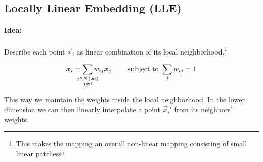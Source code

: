 

\newpage
\subsection{Locally Linear Embedding (LLE)}

\paragraph{Idea:} Describe each point \(\vec{x}_i\) as linear combination of its local neighborhood.\footnote{This makes the mapping an overall non-linear mapping consisting of small linear patches}

\[\vec{x}_i = \sum_{\mathclap{\substack{j \in N(\vec{x}_i)\\j \neq i}}} w_{ij} \vec{x}_j \qquad \text{ subject to } \sum_j w_{ij} = 1\]

This way we maintain the weights inside the local neighborhood. In the lower dimension we can then linearly interpolate a point \(\vec{x}_i'\) from its neighbors' weights. 

